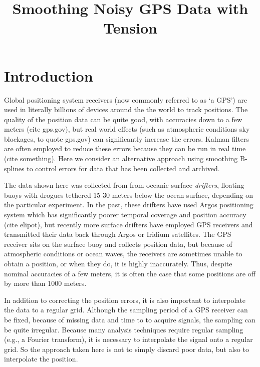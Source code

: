 \documentclass[twocol]{ametsoc}
\title{Smoothing Noisy GPS Data with Tension}
\affiliation{NorthWest Research Associates}
\begin{document}
\maketitle

\section{Introduction}
Global positioning system receivers (now commonly referred to as `a GPS') are used in literally billions of devices around the the world to track positions. The quality of the position data can be quite good, with accuracies down to a few meters (cite gps.gov), but real world effects (such as atmospheric conditions sky blockages, to quote gps.gov) can significantly increase the errors. Kalman filters are often employed to reduce these errors because they can be run in real time (cite something). Here we consider an alternative approach using smoothing B-splines to control errors for data that has been collected and archived.

The data shown here was collected from from oceanic surface \emph{drifters}, floating buoys with drogues tethered 15-30 meters below the ocean surface, depending on the particular experiment. In the past, these drifters have used Argos positioning system which has significantly poorer temporal coverage and position accuracy (cite elipot), but recently more surface drifters have employed GPS receivers and transmitted their data back through Argos or Iridium satellites. The GPS receiver sits on the surface buoy and collects position data, but because of atmospheric conditions or ocean waves, the receivers are sometimes unable to obtain a position, or when they do, it is highly inaccurately. Thus, despite nominal accuracies of a few meters, it is often the case that some positions are off by more than 1000 meters.

In addition to correcting the position errors, it is also important to interpolate the data to a regular grid. Although the sampling period of a GPS receiver can be fixed, because of missing data and time to to acquire signals, the sampling can be quite irregular. Because many analysis techniques require regular sampling (e.g., a Fourier transform), it is necessary to interpolate the signal onto a regular grid. So the approach taken here is not to simply discard poor data, but also to interpolate the position.
\end{document}

